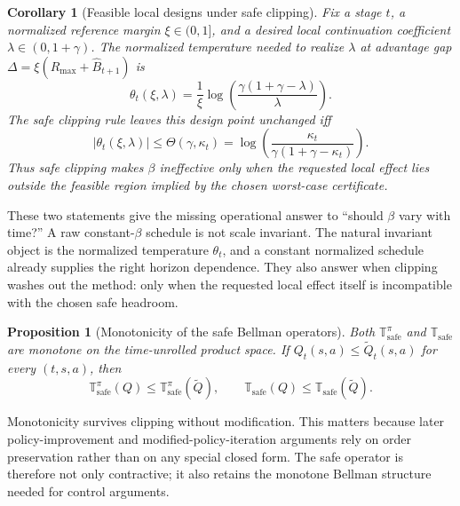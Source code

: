 \documentclass{article}
\newtheorem{proposition}[proposition]{Proposition}
\newtheorem{corollary}[corollary]{Corollary}
\theoremstyle{remark}
\newcommand{\safe}{\mathrm{safe}}
\newcommand{\Bhat}{\widehat B}
\begin{document}
\begin{corollary}[Feasible local designs under safe clipping]
\label{cor:feasible-design}
Fix a stage $t$, a normalized reference margin $\xi\in(0,1]$, and a desired local continuation coefficient $\lambda\in(0,1+\gamma)$. The normalized temperature needed to realize $\lambda$ at advantage gap $\Delta=\xi(R_{\max}+\Bhat_{t+1})$ is
\begin{equation}
\theta_t(\xi,\lambda)
=
\frac{1}{\xi}\log\!\left(\frac{\gamma(1+\gamma-\lambda)}{\lambda}\right).
\label{eq:normalized-local-design}
\end{equation}
The safe clipping rule leaves this design point unchanged iff
\begin{equation}
|\theta_t(\xi,\lambda)|
\le
\Theta(\gamma,\kappa_t)
=
\log\!\left(\frac{\kappa_t}{\gamma(1+\gamma-\kappa_t)}\right).
\label{eq:feasible-design-region}
\end{equation}
Thus safe clipping makes $\beta$ ineffective only when the requested local effect lies outside the feasible region implied by the chosen worst-case certificate.
\end{corollary}

These two statements give the missing operational answer to ``should $\beta$ vary with time?'' A raw constant-$\beta$ schedule is not scale invariant. The natural invariant object is the normalized temperature $\theta_t$, and a constant normalized schedule already supplies the right horizon dependence. They also answer when clipping washes out the method: only when the requested local effect itself is incompatible with the chosen safe headroom.

\begin{proposition}[Monotonicity of the safe Bellman operators]
\label{prop:monotonicity}
Both $\mathbb T_\safe^\pi$ and $\mathbb T_\safe$ are monotone on the time-unrolled product space.
If $Q_t(s,a)\le \widetilde Q_t(s,a)$ for every $(t,s,a)$, then
\[
\mathbb T_\safe^\pi(Q)\le \mathbb T_\safe^\pi(\widetilde Q),
\qquad
\mathbb T_\safe(Q)\le \mathbb T_\safe(\widetilde Q).
\]
\end{proposition}

Monotonicity survives clipping without modification.
This matters because later policy-improvement and modified-policy-iteration arguments rely on order preservation rather than on any special closed form.
The safe operator is therefore not only contractive; it also retains the monotone Bellman structure needed for control arguments.
\end{document}

